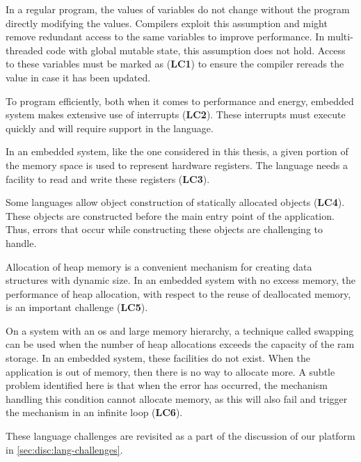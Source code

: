In a regular program, the values of variables do not change without the program directly modifying the values.
Compilers exploit this assumption and might remove redundant access to the same variables to improve performance.
In multi-threaded code with global mutable state, this assumption does not hold.
Access to these variables must be marked as  (\textbf{LC1}) to ensure the compiler rereads the value in case it has been updated.

To program efficiently, both when it comes to performance and energy, embedded system makes extensive use of interrupts (\textbf{LC2}).
These interrupts must execute quickly and will require support in the language.

In an embedded system, like the one considered in this thesis, a given portion of the memory space is used to represent hardware registers.
The language needs a facility to read and write these registers (\textbf{LC3}).

Some languages allow object construction of statically allocated objects (\textbf{LC4}).
These objects are constructed before the main entry point of the application.
Thus, errors that occur while constructing these objects are challenging to handle.

Allocation of heap memory is a convenient mechanism for creating data structures with dynamic size.
In an embedded system with no excess memory, the performance of heap allocation, with respect to the reuse of deallocated memory, is an important challenge (\textbf{LC5}).

On a system with an \gls{os} and large memory hierarchy, a technique called swapping can be used when the number of heap allocations exceeds the capacity of the \gls{ram} storage.
In an embedded system, these facilities do not exist.
When the application is out of memory, then there is no way to allocate more.
A subtle problem identified here is that when the error has occurred, the mechanism handling this condition cannot allocate memory, as this will also fail and trigger the mechanism in an infinite loop (\textbf{LC6}).

These language challenges are revisited as a part of the discussion of our platform in \autoref{sec:disc:lang-challenges}.
